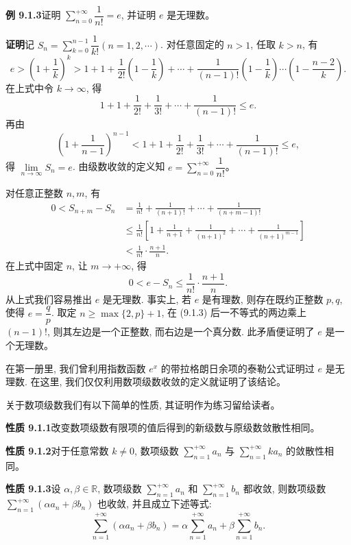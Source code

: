 \documentclass[UTF8, 12pt, fontset=fandol, oneside]{ctexart}
\begin{document}
\noindent\textbf{例 9.1.3}\quad 证明 $\sum\limits_{n=0}^{+\infty}\dfrac1{n!}=e$, 并证明 $e$ 是无理数。

\noindent\textbf{证明}\quad 记 $S_n=\sum\limits_{k=0}^{n-1}\dfrac1{k!}(n=1,2,\cdots)$. 对任意固定的 $n>1$, 任取 $k>n$, 有
\[
  e>\left(1+\frac1k\right)^k
  >1+1+\frac1{2!}\left(1-\frac1k\right)+\cdots+\frac1{(n-1)!}\left(1-\frac1k\right)\cdots\left(1-\frac{n-2}{k}\right).
\]
在上式中令 $k\to\infty$, 得
\[
  1+1+\frac1{2!}+\frac1{3!}+\cdots+\frac1{(n-1)!}\leq e.
\]
再由
\[
  \left(1+\frac1{n-1}\right)^{n-1}<1+1+\frac1{2!}+\frac1{3!}+\cdots+\frac1{(n-1)!}\leq e,
\]
得 $\lim\limits_{n\to\infty}S_n=e$. 由级数收敛的定义知 $e=\sum\limits_{n=0}^{+\infty}\dfrac1{n!}$。

对任意正整数 $n,m$, 有
\[
\begin{aligned}
  0<S_{n+m}-S_n
  &=\frac1{n!}+\frac1{(n+1)!}+\cdots+\frac1{(n+m-1)!}\\
  &\leq\frac1{n!}\left[1+\frac1{n+1}+\frac1{(n+1)^2}+\cdots+\frac1{(n+1)^{m-1}}\right]\\
  &<\frac1{n!}\cdot\frac{n+1}{n}.
\end{aligned}
\]
在上式中固定 $n$, 让 $m\to+\infty$, 得
\begin{equation}
  0<e-S_n\leq\frac1{n!}\cdot\frac{n+1}{n}.
  \tag{9.1.3}
\end{equation}
从上式我们容易推出 $e$ 是无理数. 事实上, 若 $e$ 是有理数, 则存在既约正整数 $p,q$, 使得 $e=\dfrac qp$. 取定 $n\geq\max\{2,p\}+1$, 在 (9.1.3) 后一不等式的两边乘上 $(n-1)!$, 则其左边是一个正整数, 而右边是一个真分数. 此矛盾便证明了 $e$ 是一个无理数。

在第一册里, 我们曾利用指数函数 $e^x$ 的带拉格朗日余项的泰勒公式证明过 $e$ 是无理数. 在这里, 我们仅仅利用数项级数收敛的定义就证明了该结论。

关于数项级数我们有以下简单的性质, 其证明作为练习留给读者。

\noindent\textbf{性质 9.1.1}\quad 改变数项级数有限项的值后得到的新级数与原级数敛散性相同。

\noindent\textbf{性质 9.1.2}\quad 对于任意常数 $k\neq0$, 数项级数 $\sum\limits_{n=1}^{+\infty}a_n$ 与 $\sum\limits_{n=1}^{+\infty}ka_n$ 的敛散性相同。

\noindent\textbf{性质 9.1.3}\quad 设 $\alpha,\beta\in\mathbb R$, 数项级数 $\sum\limits_{n=1}^{+\infty}a_n$ 和 $\sum\limits_{n=1}^{+\infty}b_n$ 都收敛, 则数项级数 $\sum\limits_{n=1}^{+\infty}(\alpha a_n+\beta b_n)$ 也收敛, 并且成立下述等式:
\[
  \sum_{n=1}^{+\infty}(\alpha a_n+\beta b_n)
  =\alpha\sum_{n=1}^{+\infty}a_n+\beta\sum_{n=1}^{+\infty}b_n.
\]
\end{document}
